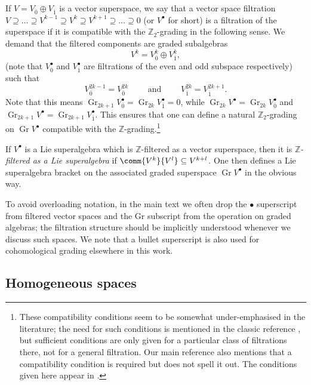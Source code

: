 \documentclass[10pt,a4paper]{amsart}
\numberwithin{equation}{section}
\newcommand{\ZZ}{\mathbb{Z}}
\newcommand{\1}{\mathbbm{1}}
\DeclareMathOperator{\Gr}{Gr}
\begin{document}
If $V=V_{\overline{0}}\oplus V_{\overline{1}}$ is a vector superspace, we say that a vector space filtration $V \supseteq \dots \supseteq V^{k-1} \supseteq V^k \supseteq V^{k+1} \supseteq \dots \supseteq 0$ (or $V^\bullet$ for short) is a filtration of the superspace if it is compatible with the $\ZZ_2$-grading in the following sense. We demand that the filtered components are graded subalgebras
\begin{equation}\label{eq:filter-super-1}
	V^k = V^k_{\overline{0}} \oplus V^k_{\overline{1}},
\end{equation}
(note that $V^\bullet_{\overline{0}}$ and $V^\bullet_{\overline{1}}$ are filtrations of the even and odd subspace respectively) such that
\begin{equation}\label{eq:filter-super-2}
	V^{2k-1}_{\overline{0}} = V^{2k}_{\overline{0}}
	\qquad	\text{ and } \qquad
	V^{2k}_{\overline{1}} = V^{2k+1}_{\overline{1}}.
\end{equation}
Note that this means $\Gr_{2k+1}V^\bullet_{\overline 0}=\Gr_{2k}V^\bullet_{\overline 1}=0$, while $\Gr_{2k} V^\bullet=\Gr_{2k} V^\bullet_{\overline0}$ and $\Gr_{2k+1} V^\bullet = \Gr_{2k+1} V^\bullet_{\overline 1}$. This ensures that one can define a natural $\ZZ_2$-grading on $\Gr V^\bullet$ compatible with the $\ZZ$-grading.\footnote{These compatibility conditions seem to be somewhat under-emphasised in the literature; the need for such conditions is mentioned in the classic reference \cite{Kac1977}, but sufficient conditions are only given for a particular class of filtrations there, not for a general filtration. Our main reference \cite{Cheng1998} also mentions that a compatibility condition is required but does not spell it out. The conditions given here appear in \cite{Scheunert1979}.}

If $V^\bullet$ is a Lie superalgebra which is $\ZZ$-filtered as a vector superspace, then it is \emph{$\ZZ$-filtered as a Lie superalgebra} if $\comm{V^k}{V^l}\subseteq V^{k+l}$. One then defines a Lie superalgebra bracket on the associated graded superspace $\Gr V^\bullet$ in the obvious way.

To avoid overloading notation, in the main text we often drop the $\bullet$ superscript from filtered vector spaces and the $\mathrm{Gr}$ subscript from the operation on graded algebras; the filtration structure should be implicitly understood whenever we discuss such spaces. We note that a bullet superscript is also used for cohomological grading elsewhere in this work.
	
\subsection{Homogeneous spaces}
\label{sec:homog-spaces}
\end{document}
